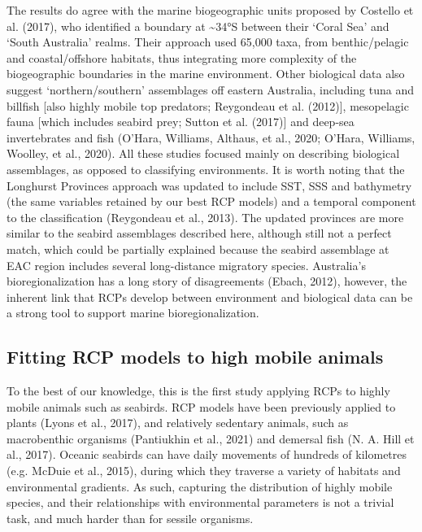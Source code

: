 \documentclass{article}
\begin{document}
\begin{linenumbers}
The results do agree with the marine biogeographic units proposed by Costello et al. (2017), who identified a boundary at \textasciitilde34°S between their `Coral Sea' and `South Australia' realms. Their approach used 65,000 taxa, from benthic/pelagic and coastal/offshore habitats, thus integrating more complexity of the biogeographic boundaries in the marine environment. Other biological data also suggest `northern/southern' assemblages off eastern Australia, including tuna and billfish {[}also highly mobile top predators; Reygondeau et al. (2012){]}, mesopelagic fauna {[}which includes seabird prey; Sutton et al. (2017){]} and deep-sea invertebrates and fish (O'Hara, Williams, Althaus, et al., 2020; O'Hara, Williams, Woolley, et al., 2020). All these studies focused mainly on describing biological assemblages, as opposed to classifying environments. It is worth noting that the Longhurst Provinces approach was updated to include SST, SSS and bathymetry (the same variables retained by our best RCP models) and a temporal component to the classification (Reygondeau et al., 2013). The updated provinces are more similar to the seabird assemblages described here, although still not a perfect match, which could be partially explained because the seabird assemblage at EAC region includes several long-distance migratory species. Australia's bioregionalization has a long story of disagreements (Ebach, 2012), however, the inherent link that RCPs develop between environment and biological data can be a strong tool to support marine bioregionalization.

\hypertarget{fitting-rcp-models-to-high-mobile-animals}{%
\subsection{Fitting RCP models to high mobile animals}\label{fitting-rcp-models-to-high-mobile-animals}}

To the best of our knowledge, this is the first study applying RCPs to highly mobile animals such as seabirds. RCP models have been previously applied to plants (Lyons et al., 2017), and relatively sedentary animals, such as macrobenthic organisms (Pantiukhin et al., 2021) and demersal fish (N. A. Hill et al., 2017). Oceanic seabirds can have daily movements of hundreds of kilometres (e.g. McDuie et al., 2015), during which they traverse a variety of habitats and environmental gradients. As such, capturing the distribution of highly mobile species, and their relationships with environmental parameters is not a trivial task, and much harder than for sessile organisms.


\end{linenumbers}
\end{document}
